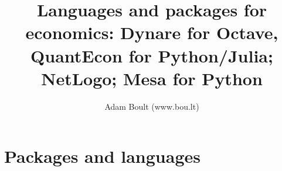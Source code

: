 \documentclass[oneside]{book}
\begin{document}
\author{Adam Boult (www.bou.lt)}
\title{Languages and packages for economics: Dynare for Octave, QuantEcon for Python/Julia; NetLogo; Mesa for Python}
\maketitle

\setcounter{tocdepth}{0}
\tableofcontents



\part{Packages and languages}




\end{document}
